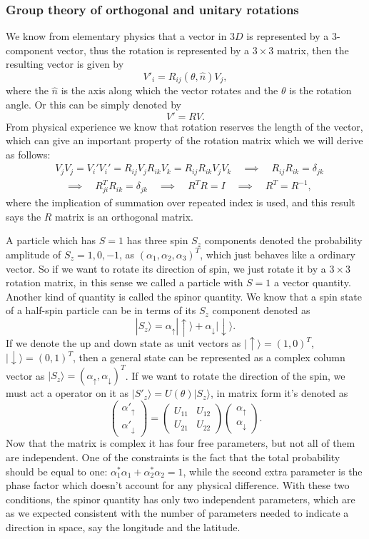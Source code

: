 \documentclass{article}
\newcommand{\be}{\begin{equation}}
\newcommand{\ee}{\end{equation}}
\newcommand{\ba}{\begin{array}}
\newcommand{\ea}{\end{array}}
\renewcommand{\1}{\left}
\renewcommand{\2}{\right}
\newcommand{\ra}{\rangle}
\newcommand{\al}{\alpha}
\newcommand{\del}{\delta}
\renewcommand{\th}{\theta}
\begin{document}
\subsubsection{Group theory of orthogonal and unitary rotations}
We know from elementary physics that a vector in $3D$ is represented by a $3$-component vector, thus the rotation is represented by a $3\times 3$ matrix, then the resulting vector is given by
\be
V'_i=R_{ij}(\th,\hat n) V_j,
\ee
where  the $\hat n$ is the axis along which the vector rotates and the $\th$ is the rotation angle. Or this can be simply denoted by 
\be V'=RV. \ee
From physical experience we know that rotation reserves the length of the vector, which can give an important property of the rotation matrix which we will derive as follows:
\be\begin{split}
&V_jV_j=V_i'V_i'=R_{ij}V_jR_{ik}V_k=R_{ij}R_{ik}V_jV_k \quad\implies\quad R_{ij}R_{ik}=\del_{jk}  \\
&\quad\implies\quad R_{ji}^TR_{ik}=\del_{jk}\quad\implies\quad R^TR=I \quad\implies\quad R^T=R^{-1},
\end{split}\ee
where the implication of summation over repeated index is used, and this result says the $R$ matrix is an orthogonal matrix.

A particle which has $S=1$ has three spin $S_z$ components denoted the probability amplitude of $S_z=1,0,-1$, as $\1( \al_1, \al_2, \al_3\2)^T$, which just behaves like a ordinary vector. So if we want to rotate its direction of spin, we just rotate it by a $3\times3$ rotation matrix, in this sense we called a particle with $S=1$ a vector quantity.\\

Another kind of quantity is called the spinor quantity. We know that a spin state of a half-spin particle can be in terms of its $S_z$ component denoted as
\be |S_z\ra=\al_\uparrow|\uparrow\ra+\al_\downarrow|\downarrow\ra. \ee
If we denote the up and down state as unit vectors as $|\uparrow\ra=(1,0)^T$, $|\downarrow\ra=(0,1)^T$, then a general state can be represented as a complex column vector as $|S_z\ra=(\al_\uparrow,\al_\downarrow)^T$. If we want to rotate the direction of the spin, we must act a operator on it as $|S'_z\ra=U(\th)|S_z\ra$, in matrix form it's denoted as
\be
\1(\ba{c}\al'_\uparrow\\\al'_\downarrow\ea\2)=\1(\ba{cc}U_{11}&U_{12}\\U_{21}&U_{22}\ea\2)\1(\ba{c}\al_\uparrow\\\al_\downarrow\ea\2).
\ee
Now that the matrix is complex  it has four free parameters, but not all of them are independent. One of the constraints is the fact that the total probability should be equal to one: $\al_1^*\al_1+\al_2^*\al_2=1$, while the second extra parameter is the phase factor which doesn't account for any physical difference. With these two conditions, the spinor quantity has only two independent parameters, which are as we expected consistent with the number of parameters needed to indicate a direction in space, say the longitude and the latitude.\\
\end{document}
